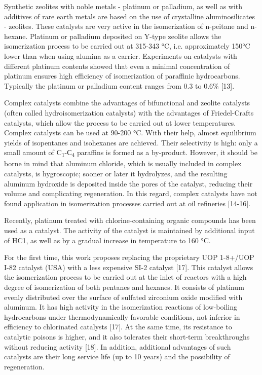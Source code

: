 \begin{multicols}{2}
Synthetic zeolites with noble metals - platinum or palladium, as well as
with additives of rare earth metals are based on the use of crystalline
aluminosilicates - zeolites. These catalysts are very active in the
isomerization of n-peitane and n-hexane. Platinum or palladium deposited
on Y-type zeolite allows the isomerization process to be carried out at
315-343 °C, i.e. approximately 150°C lower than when using alumina as a
carrier. Experiments on catalysts with different platinum contents
showed that even a minimal concentration of platinum ensures high
efficiency of isomerization of paraffinic hydrocarbons. Typically the
platinum or palladium content ranges from 0.3 to 0.6\% {[}13{]}.

Complex catalysts combine the advantages of bifunctional and zeolite
catalysts (often called hydroisomerization catalysts) with the
advantages of Friedel-Crafts catalysts, which allow the process to be
carried out at lower temperatures. Complex catalysts can be used at
90-200 °C. With their help, almost equilibrium yields of isopentanes and
isohexanes are achieved. Their selectivity is high: only a small amount
of C\textsubscript{1}-С\textsubscript{4} paraffins is formed as a
by-product. However, it should be borne in mind that aluminum chloride,
which is usually included in complex catalysts, is hygroscopic; sooner
or later it hydrolyzes, and the resulting aluminum hydroxide is
deposited inside the pores of the catalyst, reducing their volume and
complicating regeneration. In this regard, complex catalysts have not
found application in isomerization processes carried out at oil
refineries {[}14-16{]}.

Recently, platinum treated with chlorine-containing organic compounds
has been used as a catalyst. The activity of the catalyst is maintained
by additional input of HC1, as well as by a gradual increase in
temperature to 160 °C.

For the first time, this work proposes replacing the proprietary UOP
1-8+/UOP I-82 catalyst (USA) with a less expensive SI-2 catalyst
{[}17{]}. This catalyst allows the isomerization process to be carried
out at the inlet of reactors with a high degree of isomerization of both
pentanes and hexanes. It consists of platinum evenly distributed over
the surface of sulfated zirconium oxide modified with aluminum. It has
high activity in the isomerization reactions of low-boiling hydrocarbons
under thermodynamically favorable conditions, not inferior in efficiency
to chlorinated catalysts {[}17{]}. At the same time, its resistance to
catalytic poisons is higher, and it also tolerates their short-term
breakthroughs without reducing activity {[}18{]}. In addition,
additional advantages of such catalysts are their long service life (up
to 10 years) and the possibility of regeneration.


\end{multicols}
